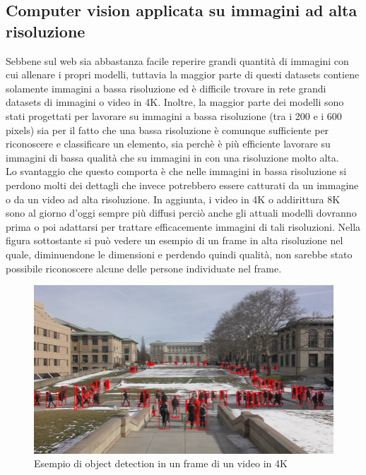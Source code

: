 \subsection{Computer vision applicata su immagini ad alta risoluzione}
Sebbene sul web sia abbastanza facile reperire grandi quantità di immagini con cui allenare i propri modelli, tuttavia la maggior parte di questi datasets contiene solamente immagini a bassa risoluzione ed è difficile trovare in rete grandi datasets di immagini o video in 4K. Inoltre, la maggior parte dei modelli sono stati progettati per lavorare su immagini a bassa risoluzione (tra i 200 e i 600 pixels) sia per il fatto che una bassa risoluzione è comunque sufficiente per riconoscere e classificare un elemento, sia perchè è più efficiente lavorare su immagini di bassa qualità che su immagini in con una risoluzione molto alta.\\
Lo svantaggio che questo comporta è che nelle immagini in bassa risoluzione si perdono molti dei dettagli che invece potrebbero essere catturati da un immagine o da un video ad alta risoluzione. In aggiunta, i video in 4K o addirittura 8K sono al giorno d'oggi sempre più diffusi perciò anche gli attuali modelli dovranno prima o poi adattarsi per trattare efficacemente immagini di tali risoluzioni. Nella figura sottostante si può vedere un esempio di un frame in alta risoluzione nel quale, diminuendone le dimensioni e perdendo quindi qualità, non sarebbe stato possibile riconoscere alcune delle persone individuate nel frame.
\begin{figure}[H]
	\centering
	\includegraphics[width=0.7\linewidth]{images/Esempio-4K-video-frame.png}
	\caption{Esempio di object detection in un frame di un video in 4K}
	\label{Esempio di object detection in un frame di un video in 4K}
\end{figure}
